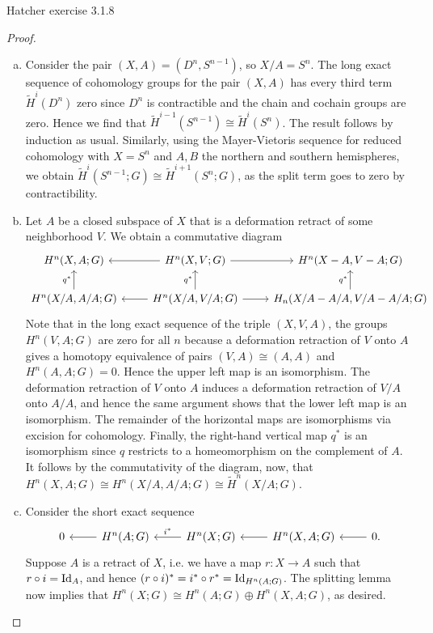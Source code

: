 \documentclass{../../mathnotes}
\begin{document}
\begin{prop}
    Hatcher exercise 3.1.8
\end{prop}
\begin{proof} \hfill
    \begin{enumerate}[(a)]
        \item Consider the pair $(X,A)=(D^n,S^{n-1})$, so $X/A=S^n$. The long exact sequence of cohomology
            groups for the pair $(X,A)$ has every third term $\tilde H^i(D^n)$ zero since $D^n$ is contractible
            and the chain and cochain groups are zero. Hence we find that $\tilde H^{i-1}(S^{n-1})\cong \tilde H^i(S^n)$.
            The result follows by induction as usual.
            Similarly, using the Mayer-Vietoris sequence for reduced cohomology with $X=S^n$ and $A,B$ the
            northern and southern hemispheres, we obtain $\tilde H^i(S^{n-1};G)\cong \tilde H^{i+1}(S^n;G)$,
            as the split term goes to zero by contractibility.
        \item Let $A$ be a closed subspace of $X$ that is a deformation retract of some neighborhood $V$.
            We obtain a commutative diagram
            \begin{equation*}
                \begin{tikzcd}
                    H^n(X,A;G) & H^n(X,V;G)\ar{l}\ar{r} & H^n(X-A,V-A;G)\\
                    H^n(X/A,A/A;G)\ar{u}{q^*} & H^n(X/A,V/A;G)\ar{l}\ar{u}{q^*}\ar{r} & H_n(X/A-A/A, V/A-A/A;G)\ar{u}{q^*}
                \end{tikzcd}
            \end{equation*}
            Note that in the long exact sequence of the triple $(X,V,A)$, the groups $H^n(V,A;G)$ are zero for all $n$
            because a deformation retraction of $V$ onto $A$ gives a homotopy equivalence of pairs $(V,A)\cong (A,A)$
            and $H^n(A,A;G)=0$. Hence the upper left map is an isomorphism. The deformation retraction of $V$ onto $A$
            induces a deformation retraction of $V/A$ onto $A/A$, and hence the same argument shows that the lower left
            map is an isomorphism. The remainder of the horizontal maps are isomorphisms via excision for cohomology.
            Finally, the right-hand vertical map $q^*$ is an isomorphism since $q$ restricts to a homeomorphism on the
            complement of $A$. It follows by the commutativity of the diagram, now, that $H^n(X,A;G)\cong H^n(X/A,A/A;G)\cong\tilde H^n(X/A;G)$.
        \item Consider the short exact sequence
            \begin{equation*}
                \begin{tikzcd}
                    0 & H^n(A;G)\ar{l} & H^n(X;G)\ar[swap]{l}{i^*} & H^n(X,A;G)\ar{l} & 0\ar{l}.
                \end{tikzcd}
            \end{equation*}
            Suppose $A$ is a retract of $X$, i.e. we have a map $r:X\to A$ such that $r\circ i=\operatorname{Id}_A$,
            and hence $(r\circ i)^*=i^*\circ r^*=\operatorname{Id}_{H^n(A;G)}$. The splitting lemma now implies
            that $H^n(X;G)\cong H^n(A;G)\oplus H^n(X,A;G)$, as desired.
    \end{enumerate}


\end{proof}
\end{document}
